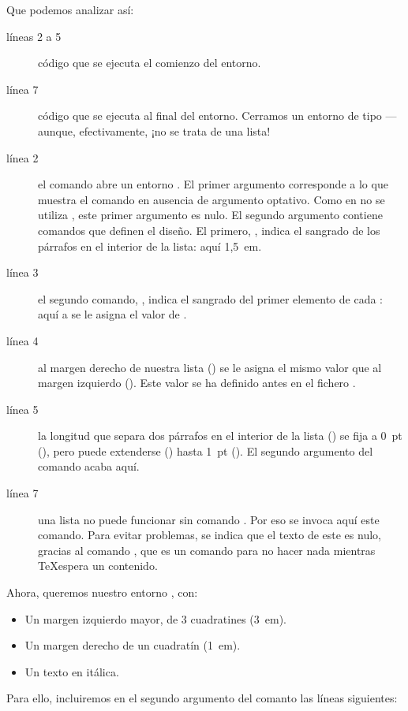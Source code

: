 Que podemos analizar así:
\begin{description}
\item[líneas 2 a 5] código que se ejecuta el comienzo del entorno.
\item[línea 7] código que se ejecuta al final del entorno. Cerramos un entorno de tipo  --- aunque, efectivamente, ¡no se trata de una lista!
\item[línea 2] el comando  abre un entorno . El primer argumento corresponde a lo que muestra el comando  en ausencia de argumento optativo. Como en  no se utiliza , este primer argumento es nulo. El segundo argumento contiene comandos que definen el diseño. El primero, , indica el sangrado de los párrafos en el interior de la lista: aquí 1,5~em.
\item[línea 3] el segundo comando, , indica el sangrado del primer elemento de cada : aquí a  se le asigna el valor de .
\item[línea 4] al margen derecho de nuestra lista () se le asigna el mismo valor que al margen izquierdo (). Este valor se ha definido antes en el fichero .
\item[línea 5]la longitud que separa dos párrafos en el interior de la lista () se fija a 0~pt (), pero puede extenderse () hasta 1~pt (). El segundo argumento del comando  acaba aquí.
\item[línea 7]una lista no puede funcionar sin comando . Por eso se invoca aquí este comando. Para evitar problemas, se indica que el texto de este  es nulo, gracias al comando , que es un comando para no hacer nada mientras \TeX espera un contenido.
\end{description}

Ahora, queremos nuestro entorno , con:
\begin{itemize}
\item Un margen izquierdo mayor, de 3 cuadratines (3~em).
\item Un margen derecho de un cuadratín (1~em).
\item Un texto en itálica.
\end{itemize}

Para ello, incluiremos en el segundo argumento del comanto  las líneas siguientes:

